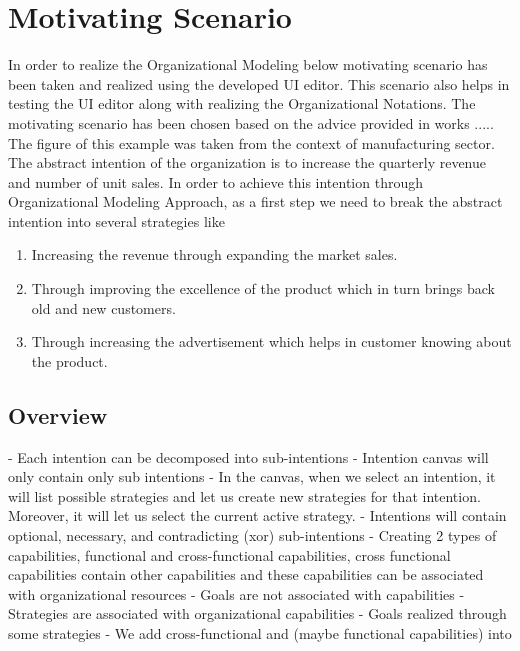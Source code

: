 \chapter{Motivating Scenario}
\label{chap:motivatingScenario}

In order to realize the Organizational Modeling  below motivating scenario has been taken and realized using the developed UI editor.
This scenario also helps in testing the UI editor along with realizing the Organizational Notations. The motivating scenario has been chosen based on the advice provided in works ..... The figure of this example was taken from the context of manufacturing sector. The abstract intention of the organization is to increase the quarterly revenue and number of unit sales. In order to achieve this intention through Organizational Modeling Approach, as a first step we need to break the abstract intention into several strategies like
\begin{enumerate}
	\item Increasing the revenue through expanding the market sales. 
	\item Through improving the excellence of the product which in turn brings back old and new customers.
	\item Through increasing the advertisement which helps in customer knowing about the product.
\end{enumerate}

\section{Overview}
\label{sec:overview}

- Each intention can be decomposed into sub-intentions
- Intention canvas will only contain only sub intentions
- In the canvas, when we select an intention, it will list possible strategies and let us create new strategies for that intention. Moreover, it will let us select the current active strategy.
- Intentions will contain optional, necessary, and contradicting (xor) sub-intentions
- Creating 2 types of capabilities, functional and cross-functional capabilities, cross functional capabilities contain other capabilities and these capabilities can be associated with organizational resources
- Goals are not associated with capabilities
- Strategies are associated with organizational capabilities
- Goals realized through some strategies
- We add cross-functional and (maybe functional capabilities) into

